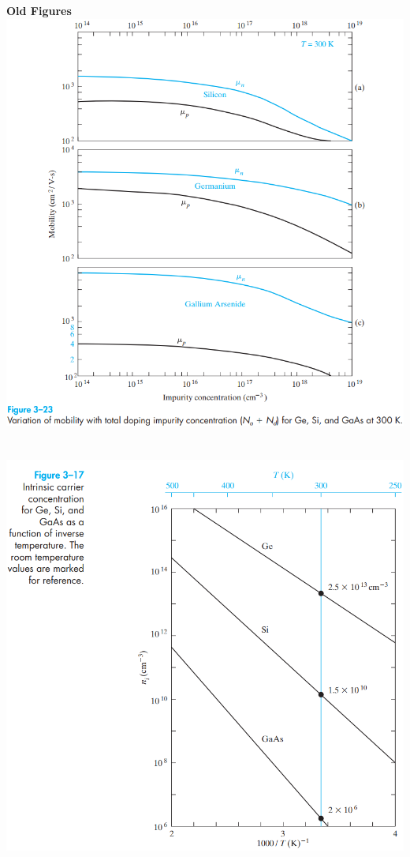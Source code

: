 \documentclass[8pt]{article}
\newcommand{\sect}[1]{\noindent\textbf{#1}\\}
\newcommand{\hl}{\noindent\makebox[\linewidth]{\rule{\textwidth}{0.2pt}}}
\begin{document}
	\begin{center}
		\sect{\Large{Old Figures}}
		\includegraphics[width=\textwidth]{fig1} \\ \hl \\~\\
		\includegraphics[width=\textwidth]{fig2} \\ \hl \\~\\

\end{center}
\end{document}
